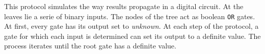 This protocol simulates the way results propagate in a digital
circuit. At the leaves lie a serie of binary inputs. The nodes of the
tree act as boolean {\tt OR} gates.
 At first, every gate has its
output set to \emph{unknown}. At each step of the protocol, a gate for
which each input is determined can set its output to a definite
value. The process iterates until the root gate has a definite value.

